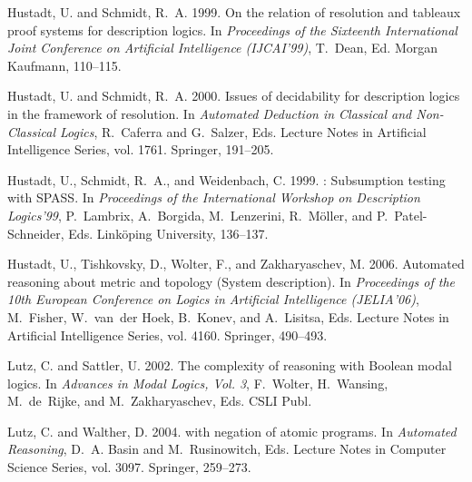 \documentclass[leqno
,pdflatex
,prodmode
,acmtocl
]{acmsmall}
\begin{document}
\begin{thebibliography}{}
{\sc Hustadt, U.} {\sc and} {\sc Schmidt, R.~A.} 1999.
\newblock On the relation of resolution and tableaux proof systems for
  description logics.
\newblock In {\em Proceedings of the Sixteenth International Joint Conference
  on Artificial Intelligence (IJCAI'99)}, {T.~Dean}, Ed. Morgan Kaufmann,
  110--115.

{\sc Hustadt, U.} {\sc and} {\sc Schmidt, R.~A.} 2000.
\newblock Issues of decidability for description logics in the framework of
  resolution.
\newblock In {\em Automated Deduction in Classical and Non-Classical Logics},
  {R.~Caferra} {and} {G.~Salzer}, Eds. Lecture Notes in Artificial Intelligence
  Series, vol. 1761. Springer, 191--205.

{\sc Hustadt, U.}, {\sc Schmidt, R.~A.}, {\sc and} {\sc Weidenbach, C.} 1999.
: Subsumption testing with {SPASS}.
\newblock In {\em Proceedings of the International Workshop on Description
  Logics'99}, {P.~Lambrix}, {A.~Borgida}, {M.~Lenzerini}, {R.~M{\"o}ller},
  {and} {P.~Patel-Schneider}, Eds. Link{\"o}ping University, 136--137.

{\sc Hustadt, U.}, {\sc Tishkovsky, D.}, {\sc Wolter, F.}, {\sc and} {\sc
  Zakharyaschev, M.} 2006.
\newblock Automated reasoning about metric and topology ({S}ystem description).
\newblock In {\em Proceedings of the 10th European Conference on Logics in
  Artificial Intelligence ({JELIA}'06)}, {M.~Fisher}, {W.~van~der Hoek},
  {B.~Konev}, {and} {A.~Lisitsa}, Eds. Lecture Notes in Artificial Intelligence
  Series, vol. 4160. Springer, 490--493.

{\sc Lutz, C.} {\sc and} {\sc Sattler, U.} 2002.
\newblock The complexity of reasoning with {B}oolean modal logics.
\newblock In {\em Advances in Modal Logics, Vol. 3}, {F.~Wolter}, {H.~Wansing},
  {M.~de~Rijke}, {and} {M.~Zakharyaschev}, Eds. CSLI Publ.

{\sc Lutz, C.} {\sc and} {\sc Walther, D.} 2004.
 with negation of atomic programs.
\newblock In {\em Automated Reasoning}, {D.~A. Basin} {and} {M.~Rusinowitch},
  Eds. Lecture Notes in Computer Science Series, vol. 3097. Springer, 259--273.


\end{thebibliography}
\end{document}

